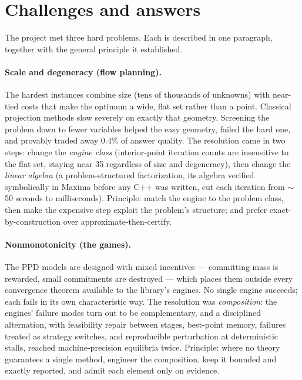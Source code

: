 \section{Challenges and answers}
\label{sec:o-challenges}

The project met three hard problems. Each is described in one paragraph,
together with the general principle it established.

\paragraph{Scale and degeneracy (flow planning).} The hardest instances
combine size (tens of thousands of unknowns) with near-tied costs that
make the optimum a wide, flat set rather than a point. Classical
projection methods slow severely on exactly that geometry. Screening the
problem down to fewer variables helped the easy geometry, failed the hard
one, and provably traded away $0.4\%$ of answer quality. The resolution
came in two steps: change the \emph{engine class} (interior-point
iteration counts are insensitive to the flat set, staying near 35
regardless of size and degeneracy), then change the \emph{linear algebra}
(a problem-structured factorization, its algebra verified symbolically in
Maxima before any C++ was written, cut each iteration from $\sim$50
seconds to milliseconds). Principle: match the engine to the problem
class, then make the expensive step exploit the problem's structure; and
prefer exact-by-construction over approximate-then-certify.

\paragraph{Nonmonotonicity (the games).} The PPD models are designed with
mixed incentives --- committing mass is rewarded, small commitments are
destroyed --- which places them outside every convergence theorem
available to the library's engines. No single engine succeeds; each fails
in its own characteristic way. The resolution was \emph{composition}: the
engines' failure modes turn out to be complementary, and a disciplined
alternation, with feasibility repair between stages, best-point memory,
failures treated as strategy switches, and reproducible perturbation at
deterministic stalls, reached machine-precision equilibria twice.
Principle: where no theory guarantees a single method, engineer the
composition, keep it bounded and exactly reported, and admit each element
only on evidence.

